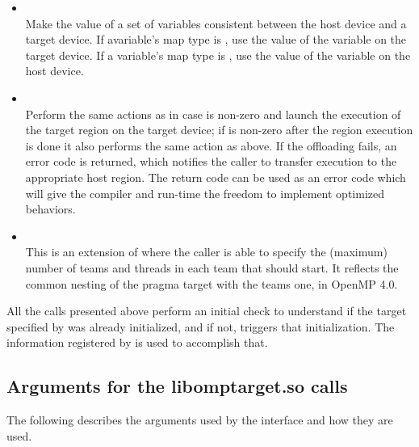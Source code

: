 \begin{itemize}
  \item {}\\

    Make the value of a set of variables consistent between the host device and a target device. If avariable’s map type is \mfrom{}, use the value of the variable on the target device. If a variable’s map type is \mto{}, use the value of the variable on the host device.
    
  \item {}\\

    Perform the same actions as  in case  is non-zero and launch the execution of the target region on the target device; if  is non-zero after the region execution is done it also performs the same action as  above. If the offloading fails, an error code is returned, which notifies the caller to transfer execution to the appropriate host region. The return code can be used as an error code which will give the compiler and run-time the freedom to implement optimized behaviors.

  \item {}\\

    This is an extension of  where the caller is able to specify the (maximum) number of teams and threads in each team that \libomptarget{} should start. It reflects the common nesting of the pragma target with the teams one, in OpenMP 4.0. 

\end{itemize}

All the  calls presented above perform an initial check to understand if the target specified by  was already initialized, and if not, triggers that initialization. The information registered by  is used to accomplish that.

\subsection{Arguments for the libomptarget.so calls}
The following describes the arguments used by the \libomptarget{} interface and how they are used.

